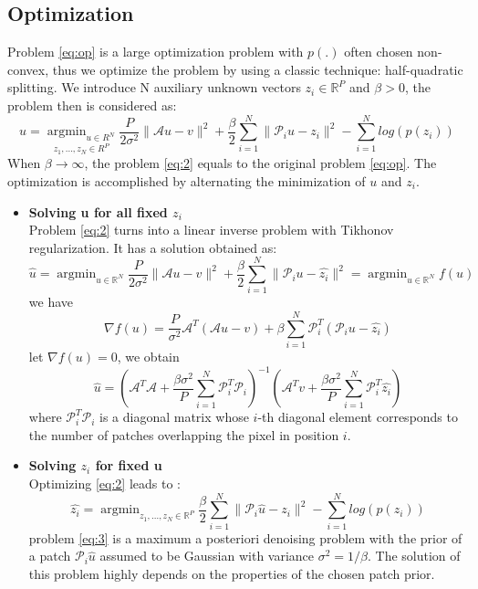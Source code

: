 \documentclass[12pt,a4paper]{article}
\DeclareMathOperator*{\argmin}{argmin}
\begin{document}
\subsection{Optimization}
Problem \eqref{eq:op} is a large optimization problem with $p(.)$ often chosen non\hyp{}convex, thus we optimize the problem by using a classic technique: half\hyp{}quadratic splitting.
We introduce N auxiliary unknown vectors $z_i \in \mathbb{R}^P$ and $\beta > 0$, the problem then is considered as:
\begin{equation}\label{eq:2}
    u = \underset{z_1,...,z_N \in R^P}{\argmin_{u\in R^N}} \frac{P}{2\sigma^2}\|\mathcal{A}u - v \|^2 + \frac{\beta}{2}\sum_{i = 1}^N \|\mathcal{P}_i u - z_i\|^2- \sum_{i = 1}^ N{log(p (z_i))}
\end{equation}
When $\beta \xrightarrow{} \infty$, the problem \eqref{eq:2} equals to the original problem \eqref{eq:op}.
The optimization is accomplished by alternating the minimization of $u$ and $z_i$. 
\begin{itemize}
    \item \textbf{Solving u for all fixed $z_i$}\\
    Problem \eqref{eq:2} turns into a linear inverse problem with Tikhonov regularization. It has a solution obtained as:
\begin{equation}
    \hat{u} = \argmin_{u \in \mathbb{R}^N} \frac{P}{2\sigma^2}\|\mathcal{A}u - v \|^2 + \frac{\beta}{2}\sum_{i = 1}^N \|\mathcal{P}_i u - \hat{z_i}\|^2 = \argmin_{u \in \mathbb{R}^N} f(u)
\end{equation}
we have
\begin{equation}
    \nabla f(u) = \frac{P}{\sigma^2}\mathcal{A}^T(\mathcal{A}u-v)+\beta \sum_{i = 1}^N \mathcal{P}_i^T(  \mathcal{P}_i u - \hat{z_i})
\end{equation}
let $\nabla f(u) = 0$, we obtain 
\begin{equation}
    \hat{u} = (\mathcal{A}^T\mathcal{A} + \frac{\beta\sigma^2}{P} \sum_{i = 1}^N \mathcal{P}_i^T \mathcal{P}_i)^{-1}(\mathcal{A}^T v + \frac{\beta\sigma^2}{P} \sum_{i = 1}^N \mathcal{P}_i^T \hat{z_i})
\end{equation}
where $\mathcal{P}_i^T \mathcal{P}_i$ is a diagonal matrix whose $i$\hyp{}th diagonal element corresponds to the number of patches overlapping the pixel in position $i$. 

\item \textbf{Solving $z_i$ for fixed u}\\
Optimizing \eqref{eq:2} leads to :
\begin{equation} \label{eq:3}
    \hat{z_i} = \argmin_{z_1,...,z_N \in \mathbb{R}^P} \frac{\beta}{2}\sum_{i = 1}^N \|\mathcal{P}_i \hat{u} - z_i\|^2- \sum_{i = 1}^ N{log(p (z_i))}
\end{equation}
problem \eqref{eq:3} is a maximum a posteriori denoising problem with the prior of a patch $\mathcal{P}_i \hat{u}$ assumed to be Gaussian with variance $\sigma ^2 = 1/\beta$.
The solution of this problem highly depends on the properties of the chosen patch prior.
\end{itemize}
\end{document}
